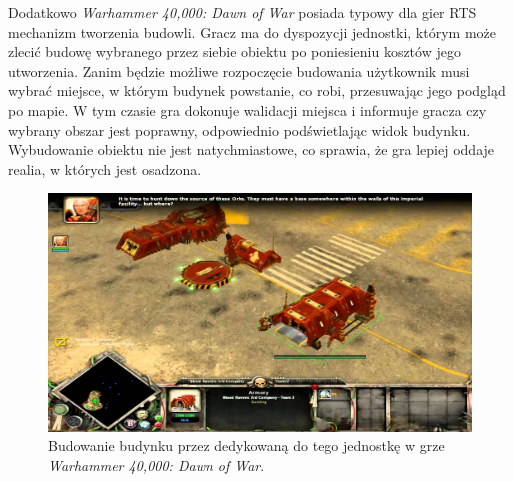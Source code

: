 Dodatkowo \textit{Warhammer 40,000: Dawn of War} posiada typowy dla gier RTS mechanizm tworzenia budowli. Gracz ma
do dyspozycji jednostki, którym może zlecić budowę wybranego przez siebie obiektu po poniesieniu kosztów jego utworzenia.
Zanim będzie możliwe rozpoczęcie budowania użytkownik musi wybrać miejsce, w którym budynek powstanie, co robi, przesuwając
jego podgląd po mapie. W tym czasie gra dokonuje walidacji miejsca i informuje gracza czy wybrany obszar jest poprawny,
odpowiednio podświetlając widok budynku. Wybudowanie obiektu nie jest natychmiastowe, co sprawia, że gra lepiej oddaje
realia, w których jest osadzona.

\begin{figure}[h!]
    \centering
    \includegraphics[width=1.0\textwidth]{images/warhammer1.jpg}
    \caption[Budowanie budynku przez dedykowaną do tego jednostkę w grze \textit{Warhammer 40,000: Dawn of War}.]{Budowanie budynku przez dedykowaną do tego jednostkę w grze \textit{Warhammer 40,000: Dawn of War}\protect\footnotemark.}
\end{figure}
\FloatBarrier
{}
